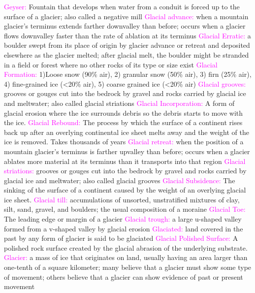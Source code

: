 \documentclass{article}
\newcommand{\pink}[1]{\textcolor{magenta}{#1}}
\newcommand{\vocab}[1]{{\pink{#1}}}
\begin{document}
\begin{multicols*}{4}
		\vocab{        Geyser: } Fountain that develops when water from a conduit is forced up to the surface of a glacier; also called a negative mill 
		\vocab{        Glacial advance: } when a mountain glacier's terminus extends farther downvalley than before; occurs when a glacier flows downvalley faster than the rate of ablation at its terminus 
		\vocab{        Glacial Erratic: } a boulder swept from its place of origin by glacier advance or retreat and deposited elsewhere as the glacier melted; after glacial melt, the boulder might be stranded in a field or forest where no other rocks of its type or size exist 
		\vocab{Glacial Formation: } 1)Loose snow (90\% air), 2) granular snow (50\% air), 3) firn (25\% air), 4) fine-grained ice (<20\% air), 5) coarse grained ice (<20\% air)  
		\vocab{        Glacial grooves: } grooves or gouges cut into the bedrock by gravel and rocks carried by glacial ice and meltwater; also called glacial striations 
		\vocab{Glacial Incorporation: } A form of glacial erosion where the ice surrounds debris so the debris starts to move with the ice.  
		\vocab{Glacial Rebound: } The process by which the surface of a continent rises back up after an overlying continental ice sheet melts away and the weight of the ice is removed. Takes thousands of years  
		\vocab{        Glacial retreat: } when the position of a mountain glacier's terminus is farther upvalley than before; occurs when a glacier ablates more material at its terminus than it transports into that region 
		\vocab{        Glacial striations: } grooves or gouges cut into the bedrock by gravel and rocks carried by glacial ice and meltwater; also called glacial grooves 
		\vocab{Glacial Subsidence: } The sinking of the surface of a continent caused by the weight of an overlying glacial ice sheet.  
		\vocab{        Glacial till: } accumulations of unsorted, unstratified mixtures of clay, silt, sand, gravel, and boulders; the usual composition of a moraine 
		\vocab{Glacial Toe: } The leading edge or margin of a glacier  
		\vocab{        Glacial trough: } a large u-shaped valley formed from a v-shaped valley by glacial erosion 
		\vocab{        Glaciated: } land covered in the past by any form of glacier is said to be glaciated 
		\vocab{Glacial Polished Surface: } A polished rock surface created by the glacial abrasion of the underlying substrate.  
		\vocab{        Glacier: } a mass of ice that originates on land, usually having an area larger than one-tenth of a square kilometer; many believe that a glacier must show some type of movement; others believe that a glacier can show evidence of past or present movement 

\end{multicols*}
\end{document}
